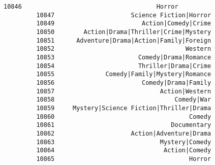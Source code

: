 \documentclass[11pt]{article}
\begin{document}
\begin{Verbatim}[commandchars=\\\{\}]
         10846                                     Horror   
         10847                     Science Fiction|Horror   
         10849                        Action|Comedy|Crime   
         10850        Action|Drama|Thriller|Crime|Mystery   
         10851      Adventure|Drama|Action|Family|Foreign   
         10852                                    Western   
         10853                       Comedy|Drama|Romance   
         10854                       Thriller|Drama|Crime   
         10855              Comedy|Family|Mystery|Romance   
         10856                        Comedy|Drama|Family   
         10857                             Action|Western   
         10858                                 Comedy|War   
         10859     Mystery|Science Fiction|Thriller|Drama   
         10860                                     Comedy   
         10861                                Documentary   
         10862                     Action|Adventure|Drama   
         10863                             Mystery|Comedy   
         10864                              Action|Comedy   
         10865                                     Horror   
         

\end{Verbatim}
\end{document}
